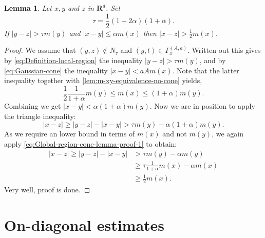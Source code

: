 \documentclass[a4paper,oneside,10pt]{amsproc}
\theoremstyle{plain}
\newtheorem{lemma}{Lemma}
\theoremstyle{remark}
\theoremstyle{definition}
\renewcommand{\leq}{\leqslant}
\renewcommand{\leq}{\leqslant}
\renewcommand{\geq}{\geqslant}
\newcommand{\R}{\mathbf R}
\renewcommand{\leq}{\leqslant}%
\renewcommand{\geq}{\geqslant}%
\begin{document}
\begin{lemma}
  \label{def:Global-region-cone-lemma}
  Let $x, y$ and $z$ in $\R^d$. Set
  \begin{equation*}
    \tau = \frac12 (1 + 2\alpha)(1 + \alpha).
  \end{equation*}
  If $|y - z| > \tau m(y)$ and $|x - y| \leq \alpha m(x)$ then $|x -
  z| > \frac12 m(x)$.
\end{lemma}
\begin{proof}
  We assume that $(y, z) \notin N_\tau$ and $(y, t) \in \Gamma_x^{(A,
    a)}$. Written out this gives by \eqref{eq:Definition-local-region}
  the inequality $|y - z| > \tau m(y)$, and by
  \eqref{eq:Gaussian-cone} the inequality $|x - y| < aA m(x)$. Note
  that the latter inequality together with
  \autoref{lem:m-xy-equivalence-no-cone} yields,
  \begin{equation}
    \label{eq:Global-region-cone-lemma-proof-1}
    \frac12 \frac1{1 + \alpha} m(y) \leq m(x) \leq (1 + \alpha) m(y).
  \end{equation}
  Combining we get $|x - y| < \alpha (1 + \alpha) m(y)$. Now we are in
  position to apply the triangle inequality:
  \begin{equation*}
    |x - z| \geq |y - z| - |x - y| > \tau m(y) - \alpha (1 + \alpha)
    m(y).
  \end{equation*}
  As we require an lower bound in terms of $m(x)$ and not $m(y)$, we
  again apply \eqref{eq:Global-region-cone-lemma-proof-1} to obtain:
  \begin{align*}
    |x - z| \geq |y - z| - |x - y| &> \tau m(y) - \alpha m(y)\\
    &\geq \tau \frac1{1 + \alpha} m(x) - \alpha m(x)\\
    &\geq \frac12 m(x).
  \end{align*}
  Very well, proof is done.
\end{proof}

\section{On-diagonal estimates}
\end{document}
